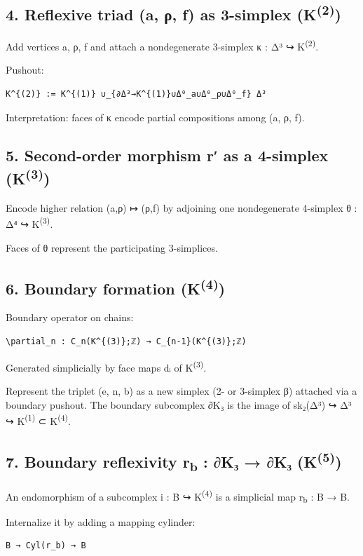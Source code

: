 \documentclass[11pt]{article}
\begin{document}
\subsection*{4. Reflexive triad (a, ρ, f) as 3-simplex (K\textsuperscript{(2)})}
\label{sec:org1914bd0}
Add vertices a, ρ, f and attach a nondegenerate 3-simplex κ : Δ³ ↪ K\textsuperscript{(2)}.

Pushout:
\begin{verbatim}
K^{(2)} := K^{(1)} ∪_{∂Δ³→K^{(1)}∪Δ⁰_a∪Δ⁰_ρ∪Δ⁰_f} Δ³
\end{verbatim}

Interpretation: faces of κ encode partial compositions among (a, ρ, f).
\subsection*{5. Second-order morphism r′ as a 4-simplex (K\textsuperscript{(3)})}
\label{sec:org89c205e}
Encode higher relation (a,ρ) ↦ (ρ,f) by adjoining one nondegenerate 4-simplex
θ : Δ⁴ ↪ K\textsuperscript{(3)}.

Faces of θ represent the participating 3-simplices.
\subsection*{6. Boundary formation (K\textsuperscript{(4)})}
\label{sec:org0f60ddf}
Boundary operator on chains:

\begin{verbatim}
\partial_n : C_n(K^{(3)};ℤ) → C_{n-1}(K^{(3)};ℤ)
\end{verbatim}

Generated simplicially by face maps dᵢ of K\textsuperscript{(3)}.

Represent the triplet (e, n, b) as a new simplex (2- or 3-simplex β) attached via
a boundary pushout.  The boundary subcomplex ∂K₃ is the image of
sk₂(Δ³) ↪ Δ³ ↪ K\textsuperscript{(1)} ⊂ K\textsuperscript{(4)}.
\subsection*{7. Boundary reflexivity r\textsubscript{b} : ∂K₃ → ∂K₃  (K\textsuperscript{(5)})}
\label{sec:orgb119b90}
An endomorphism of a subcomplex i : B ↪ K\textsuperscript{(4)} is a simplicial map r\textsubscript{b} : B → B.

Internalize it by adding a mapping cylinder:
\begin{verbatim}
B → Cyl(r_b) → B
\end{verbatim}
\end{document}
